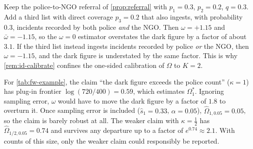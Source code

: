 \begin{example}\label{ex:id-referral3}
Keep the police-to-NGO referral of \cref{prop:referral} with $p_1=0.3$, $p_2=0.2$, $q=0.3$. Add a third list with direct coverage $p_3=0.2$ that also ingests, with probability $0.3$, incidents recorded by both police \emph{and} the NGO. Then $\omega=+1.15$ and $\bar\omega=-1.15$, so the $\omega=0$ estimator overstates the dark figure by a factor of about $3.1$. If the third list instead ingests incidents recorded by police \emph{or} the NGO, then $\omega=-1.15$, and the dark figure is understated by the same factor. This is why \cref{rem:id-calibrate} confines the one-sided calibration of $\Omega$ to $K=2$.
\end{example}

\begin{example}\label{ex:id-frontier}
For \cref{tab:fw-example}, the claim ``the dark figure exceeds the police count'' ($\kappa=1$) has plug-in frontier $\log(720/400)=0.59$, which estimates $\Omega^*_1$. Ignoring sampling error, $\omega$ would have to move the dark figure by a factor of $1.8$ to overturn it. Once sampling error is included ($\widehat s_1=0.33$, $\alpha=0.05$), $\widehat\Omega_{1,0.05}=0.05$, so the claim is barely robust at all. The weaker claim with $\kappa=\tfrac12$ has $\widehat\Omega_{1/2,0.05}=0.74$ and survives any departure up to a factor of $e^{0.74}\approx2.1$. With counts of this size, only the weaker claim could responsibly be reported.
\end{example}
